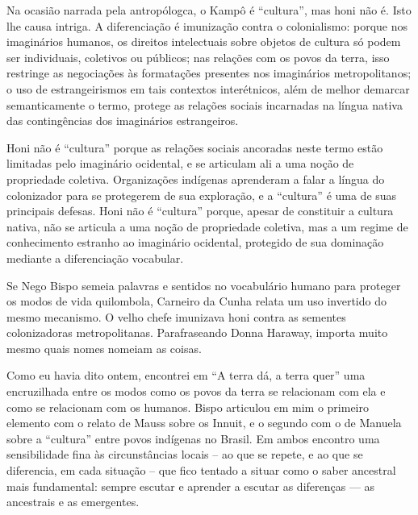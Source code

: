 Na ocasião narrada pela antropólogca, o Kampô é \enquote{cultura}, mas honi não é. Isto lhe causa intriga. A diferenciação é imunização contra o colonialismo: porque nos imaginários humanos, os direitos intelectuais sobre objetos de cultura só podem ser individuais, coletivos ou públicos; nas relações com os povos da terra, isso restringe as negociações às formatações presentes nos imaginários metropolitanos; o uso de estrangeirismos em tais contextos interétnicos, além de melhor demarcar semanticamente o termo, protege as relações sociais incarnadas na língua nativa das contingências dos imaginários estrangeiros.

Honi não é \enquote{cultura} porque as relações sociais ancoradas neste termo estão limitadas pelo imaginário ocidental, e se articulam ali a uma noção de propriedade coletiva. Organizações indígenas aprenderam a falar a língua do colonizador para se protegerem de sua exploração, e a \enquote{cultura} é uma de suas principais defesas. Honi não é \enquote{cultura} porque, apesar de constituir a cultura nativa, não se articula a uma noção de propriedade coletiva, mas a um regime de conhecimento estranho ao imaginário ocidental, protegido de sua dominação mediante a diferenciação vocabular.

Se Nego Bispo semeia palavras e sentidos no vocabulário humano para proteger os modos de vida quilombola, Carneiro da Cunha relata um uso invertido do mesmo mecanismo. O velho chefe imunizava honi contra as sementes colonizadoras metropolitanas. Parafraseando Donna Haraway, importa muito mesmo quais nomes nomeiam as coisas.

Como eu havia dito ontem, encontrei em \enquote{A terra dá, a terra quer} uma encruzilhada entre os modos como os povos da terra se relacionam com ela e como se relacionam com os humanos. Bispo articulou em mim o primeiro elemento com o relato de Mauss sobre os Innuit, e o segundo com o de Manuela sobre a \enquote{cultura} entre povos indígenas no Brasil. Em ambos encontro uma sensibilidade fina às circunstâncias locais -- ao que se repete, e ao que se diferencia, em cada situação -- que fico tentado a situar como o saber ancestral mais fundamental: sempre escutar e aprender a escutar as diferenças --- as ancestrais e as emergentes.


